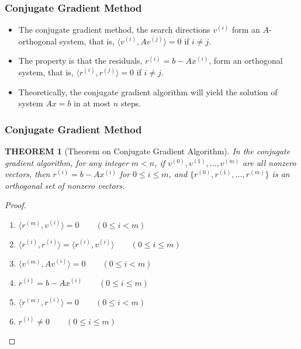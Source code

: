 \documentclass[notheorems,mathserif,table,compress]{beamer}  %
\begin{document}
%
\begin{frame}

\end{frame}

%
\begin{frame}
\frametitle{Conjugate Gradient Method} 
\begin{itemize}
\item The \textsf{conjugate gradient} method, the search directions $v^{(i)}$ form an $A$-orthogonal system, that is, $\langle v^{(i)}, Av^{(j)}\rangle=0$ if $i\neq j$.
\item The property is that the residuals, $r^{(i)}=b-Ax^{(i)}$, form an orthogonal system, that is, $\langle r^{(i)}, r^{(j)}\rangle=0$ if $i\neq j$.
\item Theoretically, the conjugate gradient algorithm will yield the solution of system $Ax=b$ in at most $n$ steps.

\end{itemize}
\end{frame}



%
\begin{frame}
\frametitle{Conjugate Gradient Method} 
\newtheorem{theorem}{THEOREM}
\begin{theorem}[Theorem on Conjugate Gradient Algorithm]
In the conjugate gradient algorithm, for any integer $m<n$, if $v^{(0)}, v^{(1)},\ldots,v^{(m)}$ are all nonzero vectors, then $r^{(i)}=b-Ax^{(i)}$ for $0\leq i\leq m$, and $\{r^{(0)}, r^{(1)},\ldots,r^{(m)}\}$ is an orthogonal set of nonzero vectors.
\end{theorem}

\begin{proof}
\begin{enumerate}
\item $\langle r^{(m)},v^{(i)}\rangle=0 \qquad (0\leq i<m)$
\item $\langle r^{(i)},r^{(i)}\rangle=\langle r^{(i)},v^{(i)}\rangle \qquad (0\leq i\leq m)$
\item $\langle v^{(m)},Av^{(i)}\rangle=0 \qquad (0\leq i<m)$
\item $r^{(i)}=b-Ax^{(i)} \qquad (0\leq i\leq m)$
\item $\langle r^{(m)},r^{(i)}\rangle=0 \qquad (0\leq i<m)$
\item $r^{(i)}\neq 0 \qquad (0\leq i\leq m)$
\end{enumerate}

\end{proof}
\end{frame}
\end{document}
